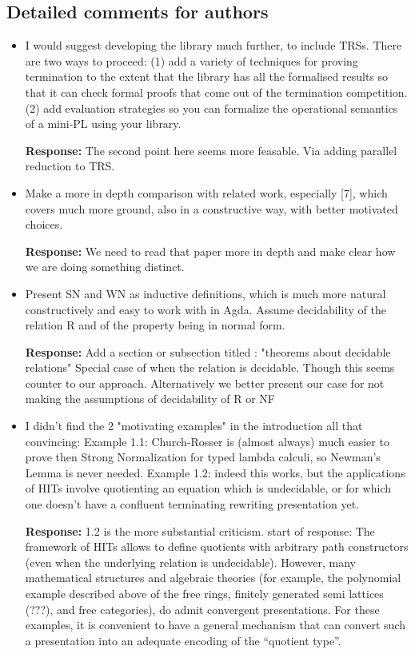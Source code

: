 \documentclass[11pt]{article}
\newcommand{\res}[1]{\par\noindent\textbf{Response:} #1\par}
\begin{document}
\subsection*{Detailed comments for authors}
\begin{itemize}
	\item I would suggest developing the library much further, to include TRSs. There are two ways to proceed: (1) add a variety of techniques for proving termination to the extent that the library has all the formalised results so that it can check formal proofs that come out of the termination competition. (2) add evaluation strategies so you can formalize the operational semantics of a mini-PL using your library.
	      \res{The second point here seems more feasable. Via adding parallel reduction to TRS.}
	\item Make a more in depth comparison with related work, especially [7], which covers much more ground, also in a constructive way, with better motivated choices.
	      \res{We need to read that paper more in depth and make clear how we are doing something distinct.}
	\item Present SN and WN as inductive definitions, which is much more natural constructively and easy to work with in Agda. Assume decidability of the relation R and of the property being in normal form.
	      \res{Add a section or subsection titled : "theorems about decidable relations" Special case of when the relation is decidable. Though this seems counter to our approach. Alternatively we better present our case for not making the assumptions of decidability of R or NF}
	\item I didn't find the 2 "motivating examples" in the introduction all that convincing: Example 1.1: Church-Rosser is (almost always) much easier to prove then Strong Normalization for typed lambda calculi, so Newman's Lemma is never needed. Example 1.2: indeed this works, but the applications of HITs involve quotienting an equation which is undecidable, or for which one doesn't have a confluent terminating rewriting presentation yet.
	      \res{1.2 is the more substantial criticism. start of response: The framework of HITs allows to define quotients with arbitrary path constructors (even when the underlying relation is undecidable). However, many mathematical structures and algebraic theories (for example, the polynomial example described above of the free rings, finitely generated semi lattices (???), and free categories), do admit convergent presentations. For these examples, it is convenient to have a general mechanism that can convert such a presentation into an adequate encoding of the “quotient type”. }


\end{itemize}
\end{document}
